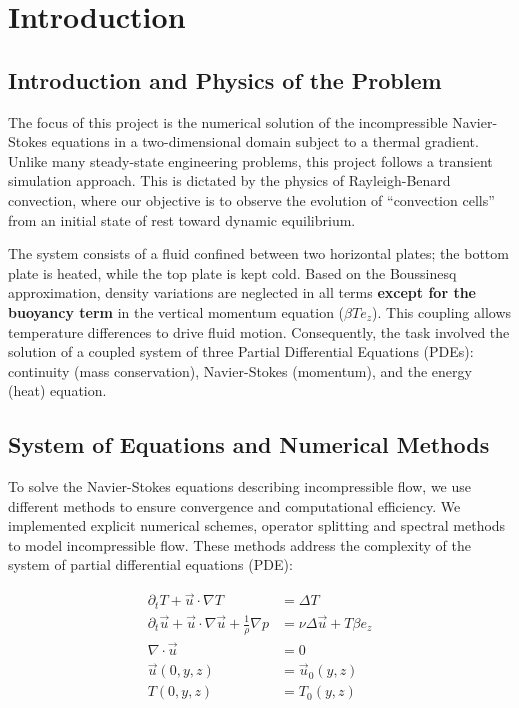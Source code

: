 \chapter{Introduction}

\section{Introduction and Physics of the Problem}


The focus of this project is the numerical solution of the incompressible Navier-Stokes equations in a two-dimensional domain subject to a thermal gradient. Unlike many steady-state engineering problems, this project follows a transient simulation approach. This is dictated by the physics of Rayleigh-Benard convection, where our objective is to observe the evolution of ``convection cells'' from an initial state of rest toward dynamic equilibrium.

The system consists of a fluid confined between two horizontal plates; the bottom plate is heated, while the top plate is kept cold. Based on the Boussinesq approximation, density variations are neglected in all terms \textbf{except for the buoyancy term} in the vertical momentum equation ($\beta T e_z$). 
This coupling allows temperature differences to drive fluid motion. Consequently, the task involved the solution of a coupled system of three Partial Differential Equations (PDEs): continuity (mass conservation), Navier-Stokes (momentum), and the energy (heat) equation.

\section{System of Equations and Numerical Methods}
To solve the Navier-Stokes equations describing incompressible flow, we use different methods to ensure convergence and computational efficiency.
We implemented explicit numerical schemes, operator splitting and spectral methods to model incompressible flow.
These methods address the complexity of the system of partial differential equations (PDE):

\begin{align}
\partial_t T + \vec u \cdot \nabla T &= \Delta T \\
\partial_t \vec u + \vec u \cdot \nabla \vec u + \frac{1}{\rho} \nabla p
&= \nu \Delta \vec u + T \beta e_z \\
\nabla \cdot \vec u &= 0 \\
\vec u(0,y,z) &= \vec u_0(y,z) \\
T(0,y,z) &= T_0(y,z)
\end{align}

